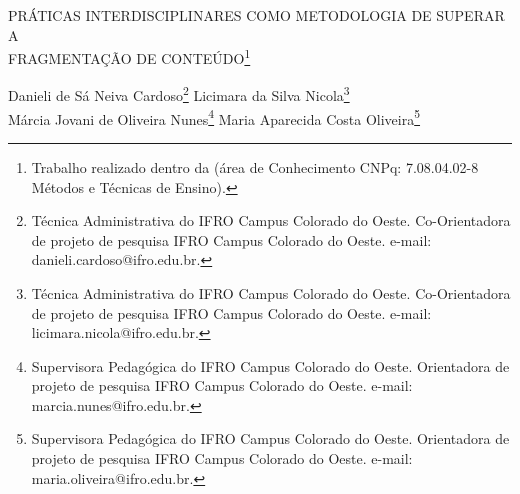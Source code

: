 \documentclass[article,12pt,onesidea,4paper,english,brazil]{abntex2}
\begin{document}
	
	
	\frenchspacing 
	
	\begin{center}
		\LARGE PRÁTICAS INTERDISCIPLINARES COMO METODOLOGIA DE SUPERAR A\\
		FRAGMENTAÇÃO DE CONTEÚDO\footnote{Trabalho realizado dentro da (área de Conhecimento CNPq: 7.08.04.02-8 Métodos e Técnicas de
			Ensino).}
		
		\normalsize
	Danieli de Sá Neiva Cardoso\footnote{Técnica Administrativa do IFRO Campus Colorado do Oeste. Co-Orientadora de projeto de pesquisa IFRO Campus Colorado do Oeste. e-mail: danieli.cardoso@ifro.edu.br.} 
	Licimara da Silva Nicola\footnote{Técnica Administrativa do IFRO Campus Colorado do Oeste. Co-Orientadora de projeto de pesquisa IFRO Campus Colorado do Oeste. e-mail: licimara.nicola@ifro.edu.br.} \\
	Márcia Jovani de Oliveira Nunes\footnote{Supervisora Pedagógica do IFRO Campus Colorado do Oeste. Orientadora de projeto de pesquisa IFRO Campus Colorado do Oeste. e-mail: marcia.nunes@ifro.edu.br.} 
	Maria Aparecida Costa Oliveira\footnote{Supervisora Pedagógica do IFRO Campus Colorado do Oeste. Orientadora de projeto de pesquisa
		IFRO Campus Colorado do Oeste. e-mail: maria.oliveira@ifro.edu.br.} 
	\end{center}
	
\end{document}
